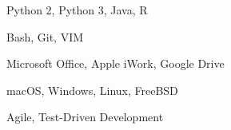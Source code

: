 
\vspace{-11.0mm}
\begin{cventries}
	
	\cventry
	{} %
	{} %
	{} %
	{} %
	{
		\begin{cvitems} %
		\begin{multicols}{2}
		\item{Python 2, Python 3, Java, R}
		\item{Bash, Git, VIM}
		\item{Microsoft Office, Apple iWork, Google Drive}
		\item{macOS, Windows, Linux, FreeBSD}
		\item{Agile, Test-Driven Development}
		\end{multicols}
		\end{cvitems}
	}	

\end{cventries}